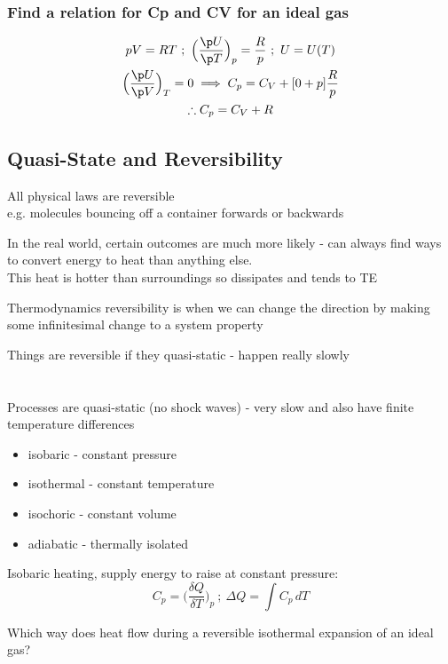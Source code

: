 \documentclass[a4paper, 11pt, normalem]{report}
\begin{document}
\subsection{Find a relation for Cp and CV for an ideal gas}
\begin{gather*}
    pV = RT ~;~ \Big(\frac{\p U}{\p T} \Big)_{p} = \frac{R}{p} ~;~ U = U(T) \\
    \Big(\frac{\p U}{\p V} \Big)_{T} = 0 \implies C_p = C_V + [0 + p]\frac{R}{p} \\
    \therefore C_p = C_V + R
\end{gather*}

\section{Quasi-State and Reversibility}
All physical laws are reversible \\
e.g. molecules bouncing off a container forwards or backwards

In the real world, certain outcomes are much more likely - can always find ways to convert energy to heat than anything else. \\
This heat is hotter than surroundings so dissipates and tends to TE

Thermodynamics reversibility is when we can change the direction by making some infinitesimal change to a system property

Things are reversible if they quasi-static - happen really slowly

\chapter{}
Processes are quasi-static (no shock waves) - very slow and also have finite temperature differences
\begin{itemize}
    \item isobaric - constant pressure
    \item isothermal - constant temperature
    \item isochoric - constant volume
    \item adiabatic - thermally isolated
\end{itemize}
Isobaric heating, supply energy to raise at constant pressure:
\begin{equation*}
    C_p = \Big(\frac{\delta Q}{\delta T}\Big)_p ~;~ \Delta Q = \int C_p \, dT
\end{equation*}

Which way does heat flow during a reversible isothermal expansion of an ideal gas?
\end{document}
